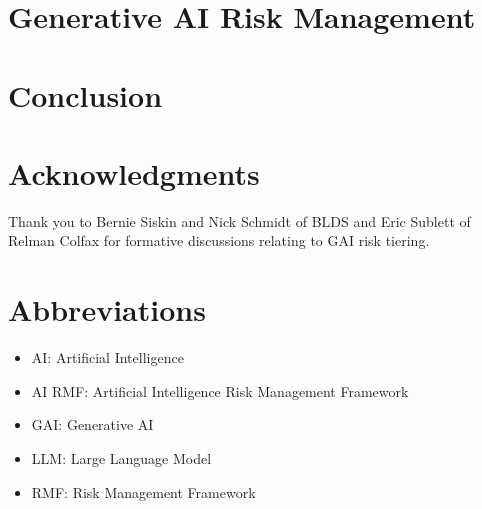 \documentclass[fleqn]{article}
\begin{document}
\section{Generative AI Risk Management}\label{sec:manage}

\section*{Conclusion}

\section*{Acknowledgments}

Thank you to Bernie Siskin and Nick Schmidt of BLDS and Eric Sublett of Relman Colfax for formative discussions relating to GAI risk tiering. 

\section*{Abbreviations}

\begin{itemize}
	\item AI: Artificial Intelligence
	\item AI RMF: Artificial Intelligence Risk Management Framework
	\item GAI: Generative AI
	\item LLM: Large Language Model
	\item RMF: Risk Management Framework
\end{itemize}



\end{document}
